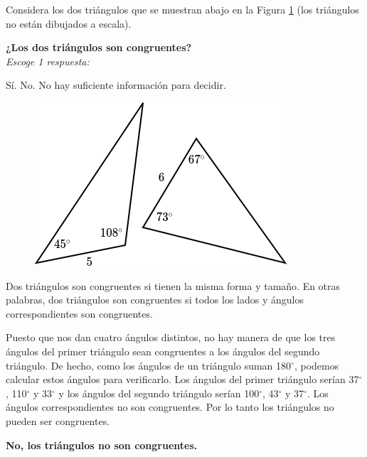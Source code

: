 Considera los dos triángulos que se muestran abajo en la Figura \ref{fig:20230323153510} (los triángulos no están dibujados a escala).

\begin{minipage}[t][][t]{0.6\textwidth}
    \textbf{¿Los dos triángulos son congruentes?}\\
    \emph{Escoge 1 respuesta:}\\

    \begin{choices}
        \choice Sí.
        \CorrectChoice No.
        \choice No hay suficiente información para decidir.
    \end{choices}
\end{minipage}%
\begin{minipage}[t][][t]{0.35\textwidth}
    \begin{figure}[H]
        \centering
        \includegraphics[width=\linewidth]{../images/20230323153510}
        \caption{}
        \label{fig:20230323153510}
    \end{figure}
\end{minipage}

\begin{solutionbox}{3cm}\footnotesize
    Dos triángulos son congruentes si tienen la misma forma y tamaño. En otras palabras, dos triángulos son congruentes si todos los lados y ángulos correspondientes son congruentes.

    Puesto que nos dan cuatro ángulos distintos, no hay manera de que los tres ángulos del primer triángulo sean congruentes a los ángulos del segundo triángulo.
    De hecho, como los ángulos de un triángulo suman 180$^\circ$, podemos calcular estos ángulos para verificarlo. Los ángulos del primer triángulo serían 37$^\circ$, 110$^\circ$ y 33$^\circ$ y los ángulos del segundo triángulo serían 100$^\circ$, 43$^\circ$ y 37$^\circ$.
    Los ángulos correspondientes no son congruentes. Por lo tanto los triángulos no pueden ser congruentes.

    \textbf{No, los triángulos no son congruentes.}
\end{solutionbox}
